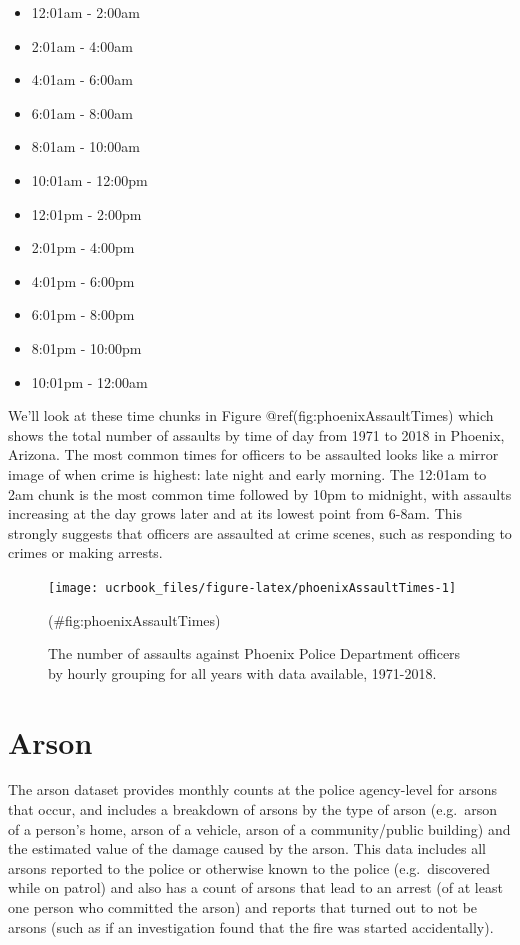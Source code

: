 \documentclass[
  12pt,
  openany]{book}
\providecommand{\tightlist}{%
  \setlength{\itemsep}{0pt}\setlength{\parskip}{0pt}}
\begin{document}
\begin{itemize}
\tightlist
\item
  12:01am - 2:00am
\item
  2:01am - 4:00am
\item
  4:01am - 6:00am
\item
  6:01am - 8:00am
\item
  8:01am - 10:00am
\item
  10:01am - 12:00pm
\item
  12:01pm - 2:00pm
\item
  2:01pm - 4:00pm
\item
  4:01pm - 6:00pm
\item
  6:01pm - 8:00pm
\item
  8:01pm - 10:00pm
\item
  10:01pm - 12:00am
\end{itemize}

We'll look at these time chunks in Figure @ref(fig:phoenixAssaultTimes) which shows the total number of assaults by time of day from 1971 to 2018 in Phoenix, Arizona. The most common times for officers to be assaulted looks like a mirror image of when crime is highest: late night and early morning. The 12:01am to 2am chunk is the most common time followed by 10pm to midnight, with assaults increasing at the day grows later and at its lowest point from 6-8am. This strongly suggests that officers are assaulted at crime scenes, such as responding to crimes or making arrests.

\begin{figure}

{\centering \texttt{[image: ucrbook\_files/figure-latex/phoenixAssaultTimes-1]} 

}

\caption{The number of assaults against Phoenix Police Department officers by hourly grouping for all years with data available, 1971-2018.}(\#fig:phoenixAssaultTimes)
\end{figure}

\hypertarget{arsonChapter}{%
\chapter{Arson}\label{arsonChapter}}

The arson dataset provides monthly counts at the police agency-level for arsons that occur, and includes a breakdown of arsons by the type of arson (e.g.~arson of a person's home, arson of a vehicle, arson of a community/public building) and the estimated value of the damage caused by the arson. This data includes all arsons reported to the police or otherwise known to the police (e.g.~discovered while on patrol) and also has a count of arsons that lead to an arrest (of at least one person who committed the arson) and reports that turned out to not be arsons (such as if an investigation found that the fire was started accidentally).
\end{document}
